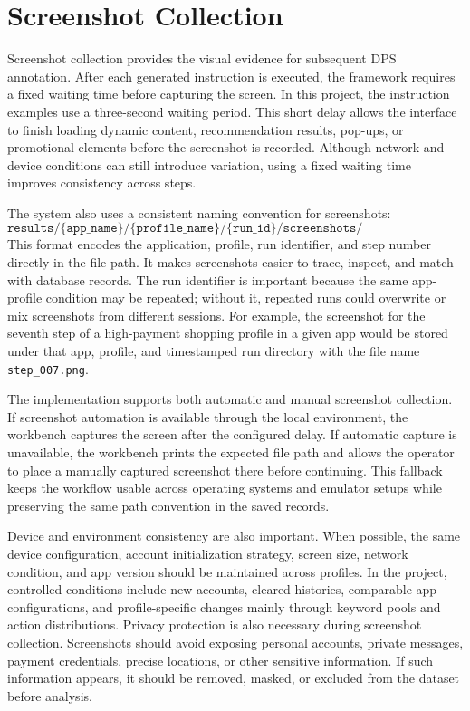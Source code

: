 \section{Screenshot Collection}

Screenshot collection provides the visual evidence for subsequent DPS annotation. After each generated instruction is executed, the framework requires a fixed waiting time before capturing the screen. In this project, the instruction examples use a three-second waiting period. This short delay allows the interface to finish loading dynamic content, recommendation results, pop-ups, or promotional elements before the screenshot is recorded. Although network and device conditions can still introduce variation, using a fixed waiting time improves consistency across steps.

The system also uses a consistent naming convention for screenshots:
\[
\texttt{results/\{app\_name\}/\{profile\_name\}/\{run\_id\}/screenshots/step\_\{step\_id\}.png}
\]
This format encodes the application, profile, run identifier, and step number directly in the file path. It makes screenshots easier to trace, inspect, and match with database records. The run identifier is important because the same app-profile condition may be repeated; without it, repeated runs could overwrite or mix screenshots from different sessions. For example, the screenshot for the seventh step of a high-payment shopping profile in a given app would be stored under that app, profile, and timestamped run directory with the file name \texttt{step\_007.png}.

The implementation supports both automatic and manual screenshot collection. If screenshot automation is available through the local environment, the workbench captures the screen after the configured delay. If automatic capture is unavailable, the workbench prints the expected file path and allows the operator to place a manually captured screenshot there before continuing. This fallback keeps the workflow usable across operating systems and emulator setups while preserving the same path convention in the saved records.

Device and environment consistency are also important. When possible, the same device configuration, account initialization strategy, screen size, network condition, and app version should be maintained across profiles. In the project, controlled conditions include new accounts, cleared histories, comparable app configurations, and profile-specific changes mainly through keyword pools and action distributions. Privacy protection is also necessary during screenshot collection. Screenshots should avoid exposing personal accounts, private messages, payment credentials, precise locations, or other sensitive information. If such information appears, it should be removed, masked, or excluded from the dataset before analysis.

